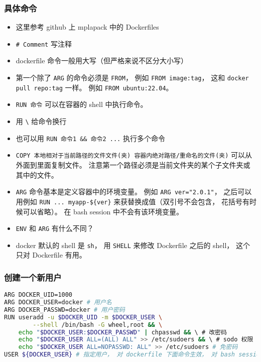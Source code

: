 \subsubsection{具体命令}
\begin{itemize}
\item 这里参考 github 上 mplapack 中的 Dockerfiles
\item \verb|# Comment| 写注释
\item dockerfile 命令一般用大写（但严格来说不区分大小写）
\item 第一个除了 \verb|ARG| 的命令必须是 \verb|FROM|， 例如 \verb|FROM image:tag|， 这和 \verb|docker pull repo:tag| 一样。 例如 \verb|FROM ubuntu:22.04|。
\item \verb|RUN 命令| 可以在容器的 shell 中执行命令。
\item 用 \verb|\| 给命令换行
\item 也可以用 \verb|RUN 命令1 && 命令2 ...| 执行多个命令
\item \verb|COPY 本地相对于当前路径的文件文件(夹) 容器内绝对路径/重命名的文件(夹)| 可以从外面到里面复制文件。 注意第一个路径必须是当前文件夹的某个子文件夹或其中的文件。
\item \verb|ARG| 命令基本是定义容器中的环境变量。 例如 \verb|ARG ver="2.0.1"|， 之后可以用例如 \verb|RUN ... myapp-${ver}| 来获替换成值（双引号不会包含， 花括号有时候可以省略）。 在 bash session 中不会有该环境变量。
\item \verb|ENV| 和 \verb|ARG| 有什么不同？
\item docker 默认的 shell 是 \verb|sh|， 用 \verb|SHELL| 来修改 Dockerfile 之后的 shell， 这个只对 Dockerfile 有用。
\end{itemize}

\subsubsection{创建一个新用户}
\begin{lstlisting}[language=bash]
ARG DOCKER_UID=1000
ARG DOCKER_USER=docker # 用户名
ARG DOCKER_PASSWD=docker # 用户密码
RUN useradd -u $DOCKER_UID -m $DOCKER_USER \
        --shell /bin/bash -G wheel,root && \
    echo "$DOCKER_USER:$DOCKER_PASSWD" | chpasswd && \ # 改密码
    echo "$DOCKER_USER ALL=(ALL) ALL" >> /etc/sudoers && \ # sodo 权限
    echo "$DOCKER_USER ALL=NOPASSWD: ALL" >> /etc/sudoers # 免密码
USER ${DOCKER_USER} # 指定用户， 对 dockerfile 下面命令生效， 对 bash session 生效。
\end{lstlisting}

